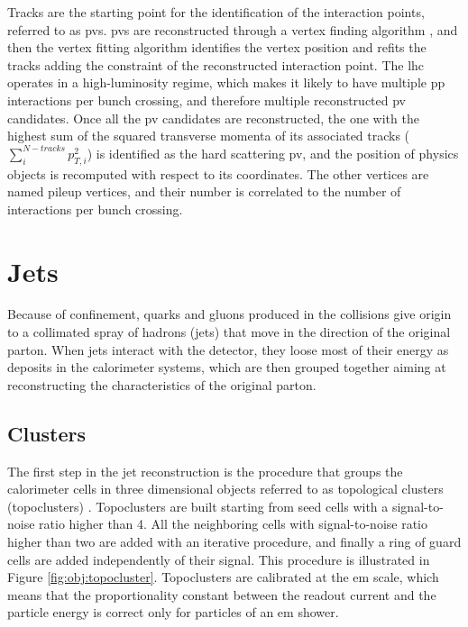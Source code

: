 Tracks are the starting point for the identification of the interaction points, referred to as \glspl{pv}. 
\glspl{pv} are reconstructed through a vertex finding algorithm \cite{Fruhwirth:2007hz}, 
and then the vertex fitting algorithm identifies the vertex position and refits the tracks 
adding the constraint of the reconstructed interaction point. 
The \gls{lhc} operates in a high-luminosity regime, which makes it likely to have multiple \gls{pp} interactions per bunch crossing, 
and therefore multiple reconstructed \gls{pv} candidates. 
Once all the \gls{pv} candidates are reconstructed, the one with the highest sum of the squared transverse momenta of its associated tracks ($\sum_i^{N-tracks}p_{T,i}^2$) is identified as the hard scattering \gls{pv}, and the position of physics objects is recomputed with respect to its coordinates. The other vertices are named pileup vertices, and their number is correlated  to the number of interactions per bunch crossing.


\section{Jets}

Because of confinement, quarks and gluons produced in the collisions give origin to a collimated spray of hadrons (jets) that move in the direction of the original parton. When jets interact with the detector, they loose most of their energy as deposits in the calorimeter systems, which are then grouped together aiming at reconstructing the characteristics of the original parton. 

\subsection{Clusters}
The first step in the jet reconstruction is the procedure that groups the calorimeter cells in three dimensional objects referred to as topological clusters (topoclusters) \cite{ATL-LARG-PUB-2008-002,Aad:2016upy}. Topoclusters are built starting from seed cells with a signal-to-noise ratio higher than 4. All the neighboring cells with signal-to-noise ratio higher than two are added with an iterative procedure, and finally a ring of guard cells are added independently of their signal. This procedure is illustrated in Figure \ref{fig:obj:topocluster}. Topoclusters are calibrated at the \gls{em} scale, which means that the proportionality constant between the readout current and the particle energy is correct only for particles of an \gls{em} shower.

